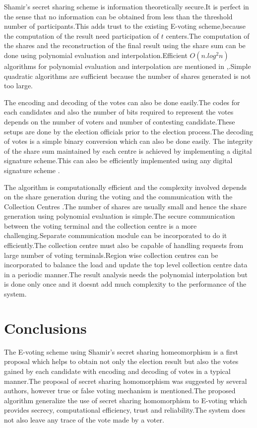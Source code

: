 \documentclass[conference]{IEEEtran}
\begin{document}
Shamir's secret sharing scheme is information theoretically secure.It is perfect in the sense that no information can be obtained from less than the threshold number of participants.This adds trust to the existing E-voting scheme,because the computation of the result need participation of $t$ centers.The computation of the shares and the reconstruction of the final result using the share sum can be done using polynomial evaluation and interpolation.Efficient $O(n.log^2n)$ algorithms for polynomial evaluation and interpolation are mentioned in \cite{aho1974design},\cite{lloyd1982art}.Simple quadratic algorithms are sufficient because the number of shares generated is not too large.

The encoding and decoding of the votes can also be done easily.The codes for each candidates and also the number of bits required to represent the votes depends on the number of voters and number of contesting candidate.These setups are done by the election officials prior  to the election process.The decoding of votes is a simple binary conversion which can also be done easily.
The integrity of the share sum maintained by each centre is achieved by implementing a digital signature scheme.This can also be efficiently implemented
using any digital signature scheme \cite{atreya2002digital}. 

The algorithm is computationally efficient and the complexity involved  depends on the share generation during the voting and the communication with the Collection Centres .The number of shares are usually small and hence the share generation using polynomial evaluation is simple.The secure communication between the voting terminal and the collection centre is a more challenging.Separate communication module can be incorporated to do it efficiently.The collection centre must also be capable of handling requests from large number of voting terminals.Region wise collection centres can be incorporated to balance the load and update the top level collection centre data in a periodic manner.The result analysis needs the polynomial interpolation but is done only once and it doesnt add much complexity to the performance of the system.


\section{Conclusions}
\label{section:conclusions}
The E-voting scheme using Shamir's secret sharing homeomorphism is a first proposal which helps to obtain not only the election result but also the votes gained by each candidate with encoding and decoding of votes in a typical manner.The proposal of secret sharing homomorphism was suggested by several authors, however true or false voting mechanism is mentioned.The proposed algorithm generalize the use of secret sharing homomorphism to E-voting which provides secrecy, computational efficiency, trust and reliability.The system does not also leave any trace of the vote made by a voter.
\end{document}
